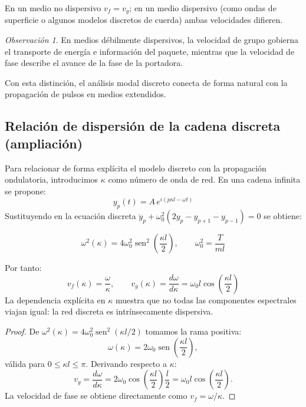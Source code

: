 \documentclass[12pt, a4paper]{article}
\theoremstyle{plain}
\theoremstyle{definition}
\theoremstyle{remark}
\newtheorem*{observacion}{Observación}
\DeclareMathOperator{\sen}{sen}
\begin{document}
En un medio no dispersivo $v_f=v_g$; en un medio dispersivo (como ondas de superficie o
algunos modelos discretos de cuerda) ambas velocidades difieren.
\begin{observacion}
En medios débilmente dispersivos, la velocidad de grupo gobierna el transporte de energía e
información del paquete, mientras que la velocidad de fase describe el avance de la fase de
la portadora.
\end{observacion}
Con esta distinción, el análisis modal discreto conecta de forma natural con la propagación
de pulsos en medios extendidos.

\subsection{Relación de dispersión de la cadena discreta (ampliación)}

Para relacionar de forma explícita el modelo discreto con la propagación ondulatoria,
introducimos $\kappa$ como número de onda de red. En una cadena infinita se propone:
\begin{equation}
  y_p(t)=A\,e^{i(p\kappa l-\omega t)}
\end{equation}
Sustituyendo en la ecuación discreta
$\ddot{y}_p+\omega_0^2(2y_p-y_{p+1}-y_{p-1})=0$ se obtiene:
\begin{mdframed}[style=resultado]
\begin{equation}
  \omega^2(\kappa)=4\omega_0^2\sen^2\!\left(\frac{\kappa l}{2}\right),
  \qquad \omega_0^2=\frac{T}{ml}
\end{equation}
\end{mdframed}
Por tanto:
\begin{equation}
  v_f(\kappa)=\frac{\omega}{\kappa},\qquad
  v_g(\kappa)=\frac{d\omega}{d\kappa}
  =\omega_0 l\cos\!\left(\frac{\kappa l}{2}\right)
\end{equation}
La dependencia explícita en $\kappa$ muestra que no todas las componentes espectrales
viajan igual: la red discreta es intrínsecamente dispersiva.

\begin{proof}
De
$\omega^2(\kappa)=4\omega_0^2\sen^2(\kappa l/2)$ tomamos la rama positiva:
\begin{equation}
  \omega(\kappa)=2\omega_0\sen\!\left(\frac{\kappa l}{2}\right),
\end{equation}
válida para $0\le \kappa l\le \pi$. Derivando respecto a $\kappa$:
\begin{equation}
  v_g=\frac{d\omega}{d\kappa}
  =2\omega_0\cos\!\left(\frac{\kappa l}{2}\right)\frac{l}{2}
  =\omega_0 l\cos\!\left(\frac{\kappa l}{2}\right).
\end{equation}
La velocidad de fase se obtiene directamente como
$v_f=\omega/\kappa$.
\end{proof}
\end{document}
